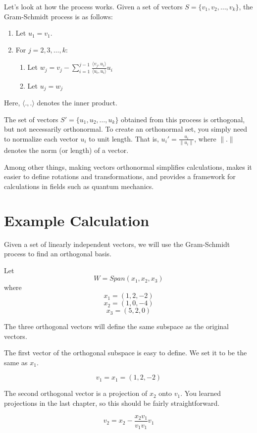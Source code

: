 Let's look at how the process works. Given a set of vectors $S = \{v_1, v_2, \ldots, v_k\}$, the Gram-Schmidt process is as follows:

\begin{enumerate}
    \item Let $u_1 = v_1$.
    \item For $j = 2, 3, \ldots, k$:
    \begin{enumerate}
        \item Let $w_j = v_j - \sum_{i=1}^{j-1} \frac{\langle v_j, u_i \rangle}{\langle u_i, u_i \rangle} u_i$
        \item Let $u_j = w_j$
    \end{enumerate}
\end{enumerate}

Here, $\langle . , . \rangle$ denotes the inner product. 

The set of vectors $S' = \{u_1, u_2, \ldots, u_k\}$ obtained from this
process is orthogonal, but not necessarily orthonormal. To create
an orthonormal set, you simply need to normalize each vector $u_i$ to
unit length. That is, $u_i' = \frac{u_i}{\|u_i\|}$, where $\|.\|$
denotes the norm (or length) of a vector.

Among other things, making vectors orthonormal simplifies calculations, makes it easier to define rotations and transformations, and provides a framework for calculations in fields such as quantum mechanics.

\section{Example Calculation}

Given a set of linearly independent vectors, we will use the Gram-Schmidt process to find an orthogonal basis.

Let $$W = Span (x_1, x_2, x_3)$$ where
$$x_1 = (1, 2, -2) $$
$$x_2 = (1,0,-4) $$
$$x_3 = (5,2,0)$$

The three orthogonal vectors will define the same subspace as the original vectors. 

The first vector of the orthogonal subspace is easy to define. We set it to be the same as $x_1$.

$$v_1 = x_1 = (1, 2, -2)$$

The second orthogonal vector is a projection of $x_2$ onto $v_1$. You learned projections in the last chapter, so this should be fairly straightforward.

$$v_2 = x_2 - \frac{x_2v_1}{v_1v_1} v_1$$

